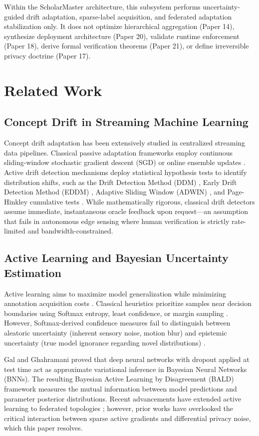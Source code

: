 \documentclass[conference]{IEEEtran}
\begin{document}
Within the ScholarMaster architecture, this subsystem performs uncertainty-guided drift adaptation, sparse-label acquisition, and federated adaptation stabilization only. It does not optimize hierarchical aggregation (Paper 14), synthesize deployment architecture (Paper 20), validate runtime enforcement (Paper 18), derive formal verification theorems (Paper 21), or define irreversible privacy doctrine (Paper 17).

\section{Related Work}

\subsection{Concept Drift in Streaming Machine Learning}
Concept drift adaptation has been extensively studied in centralized streaming data pipelines. Classical passive adaptation frameworks employ continuous sliding-window stochastic gradient descent (SGD) or online ensemble updates \cite{b28, b16}. Active drift detection mechanisms deploy statistical hypothesis tests to identify distribution shifts, such as the Drift Detection Method (DDM) \cite{b17}, Early Drift Detection Method (EDDM) \cite{b18}, Adaptive Sliding Window (ADWIN) \cite{b22}, and Page-Hinkley cumulative tests \cite{b2}. While mathematically rigorous, classical drift detectors assume immediate, instantaneous oracle feedback upon request---an assumption that fails in autonomous edge sensing where human verification is strictly rate-limited and bandwidth-constrained.

\subsection{Active Learning and Bayesian Uncertainty Estimation}
Active learning aims to maximize model generalization while minimizing annotation acquisition costs \cite{b19, b23}. Classical heuristics prioritize samples near decision boundaries using Softmax entropy, least confidence, or margin sampling \cite{b24}. However, Softmax-derived confidence measures fail to distinguish between aleatoric uncertainty (inherent sensory noise, motion blur) and epistemic uncertainty (true model ignorance regarding novel distributions) \cite{b33}. 

Gal and Ghahramani \cite{b21} proved that deep neural networks with dropout applied at test time act as approximate variational inference in Bayesian Neural Networks (BNNs). The resulting Bayesian Active Learning by Disagreement (BALD) framework \cite{b25} measures the mutual information between model predictions and parameter posterior distributions. Recent advancements have extended active learning to federated topologies \cite{b26, b27}; however, prior works have overlooked the critical interaction between sparse active gradients and differential privacy noise, which this paper resolves.
\end{document}
